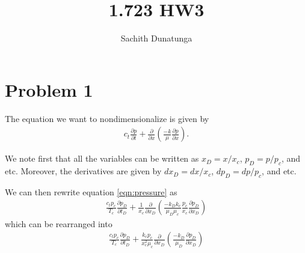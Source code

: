 \documentclass{article}
\title{1.723 HW3}
\author{Sachith  Dunatunga}
\begin{document}
\maketitle

\section{Problem 1}
The equation we want to nondimensionalize is given by
\begin{align}
    c_t \frac{\partial p}{\partial t} + \frac{\partial}{\partial x} \left( \frac{-k}{\mu} \frac{\partial p}{\partial x} \right).
    \label{eqn:pressure}
\end{align}

We note first that all the variables can be written as $x_D = x / x_c$, $p_D = p / p_c$, and etc.
Moreover, the derivatives are given by $dx_D = dx / x_c$, $dp_D = dp / p_c$, and etc.

We can then rewrite equation \eqref{eqn:pressure} as
\begin{align}
    \frac{c_t p_c}{T_c} \frac{\partial p_D}{\partial t_D} + \frac{1}{x_c} \frac{\partial}{\partial x_D} \left( \frac{-k_D k_c}{\mu_D \mu_c} \frac{p_c}{x_c} \frac{\partial p_D}{\partial x_D} \right)
\end{align}
which can be rearranged into
\begin{align}
    \frac{c_t p_c}{T_c} \frac{\partial p_D}{\partial t_D} + \frac{k_c p_c}{x_c^2 \mu_c} \frac{\partial}{\partial x_D} \left( \frac{-k_D}{\mu_D}\frac{\partial p_D}{\partial x_D} \right)
\end{align}

% 
\end{document}
